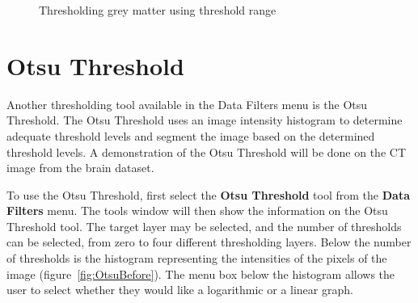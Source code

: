 \documentclass[fleqn,11pt,openany]{book}
\begin{document}
\begin{figure}
\caption{Thresholding grey matter using threshold range}\label{fig:ThresholdGrayMatter}
\end{figure}

\section{Otsu Threshold}

Another thresholding tool available in the Data Filters menu is the Otsu Threshold. The Otsu Threshold uses an image intensity histogram to determine adequate threshold levels and segment the image based on the determined threshold levels. A demonstration of the Otsu Threshold will be done on the CT image from the brain dataset.

To use the Otsu Threshold, first select the {\bf Otsu Threshold} tool from the {\bf Data Filters} menu. The tools window will then show the information on the Otsu Threshold tool. The target layer may be selected, and the number of thresholds can be selected, from zero to four different thresholding layers. Below the number of thresholds is the histogram representing the intensities of the pixels of the image (figure~\ref{fig:OtsuBefore}). The menu box below the histogram allows the user to select whether they would like a logarithmic or a linear graph.
\end{document}
